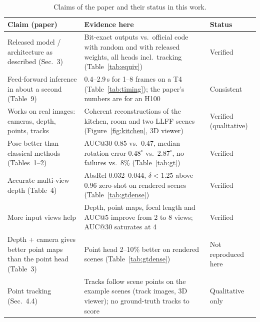 \documentclass[11pt,a4paper]{article}
\begin{document}
\begin{table}[htbp]
\centering
\caption{Claims of the paper and their status in this work.}
\label{tab:claims}
\renewcommand{\arraystretch}{1.25}
\begin{tabular}{p{4.6cm}p{8.0cm}p{2.0cm}}
\toprule
Claim (paper) & Evidence here & Status \\
\midrule
Released model / architecture as described (Sec.~3) &
Bit-exact outputs vs.\ official code with random and with released weights, all heads incl.\ tracking (Table~\ref{tab:equiv}) & Verified \\
Feed-forward inference in about a second (Table~9) &
0.4--2.9\,s for 1--8 frames on a T4 (Table~\ref{tab:timing}); the paper's numbers are for an H100 & Consistent \\
Works on real images: cameras, depth, points, tracks &
Coherent reconstructions of the kitchen, room and two LLFF scenes (Figure~\ref{fig:kitchen}, 3D viewer) & Verified (qualitative) \\
Pose better than classical methods (Tables~1--2) &
AUC@30 0.85 vs.\ 0.47, median rotation error $0.48^\circ$ vs.\ $2.87^\circ$, no failures vs.\ 8\% (Table~\ref{tab:gt}) & Verified \\
Accurate multi-view depth (Table~4) &
AbsRel 0.032--0.044, $\delta<1.25$ above 0.96 zero-shot on rendered scenes (Table~\ref{tab:gtdense}) & Verified \\
More input views help &
Depth, point maps, focal length and AUC@5 improve from 2 to 8 views; AUC@30 saturates at 4 & Verified \\
Depth + camera gives better point maps than the point head (Table~3) &
Point head 2--10\% better on rendered scenes (Table~\ref{tab:gtdense}) & Not reproduced here \\
Point tracking (Sec.~4.4) &
Tracks follow scene points on the example scenes (track images, 3D viewer); no ground-truth tracks to score & Qualitative only \\
\bottomrule
\end{tabular}
\end{table}
\end{document}
